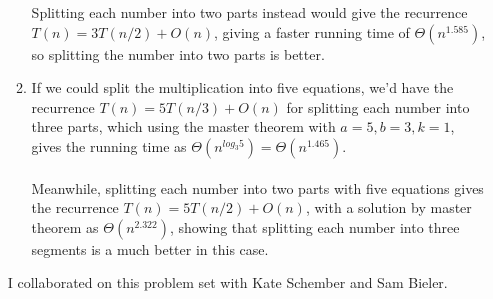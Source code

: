 \documentclass[11pt]{article}
\begin{document}
\begin{enumerate}
\begin{enumerate}[label=(\alph*)]
Splitting each number into two parts instead would give the recurrence $T(n) = 3T(n/2) + O(n)$, giving a faster running time of $\Theta(n^{1.585})$, so splitting the number into two parts is better. 

\item
If we could split the multiplication into five equations, we'd have the recurrence $T(n) = 5T(n/3) + O(n)$ for splitting each number into three parts, which using the master theorem with $a = 5, b = 3, k = 1$, gives the running time as $\Theta(n^{log_3 5}) = \Theta(n^{1.465})$. \\
\\
Meanwhile, splitting each number into two parts with five equations gives the recurrence $T(n) = 5T(n/2) + O(n)$, with a solution by master theorem as $\Theta(n^{2.322})$, showing that splitting each number into three segments is a much better in this case. 

\end{enumerate}

I collaborated on this problem set with Kate Schember and Sam Bieler. 


\end{enumerate}
\end{document}
